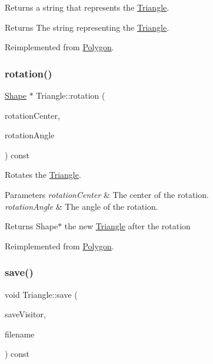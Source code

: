 Returns a string that represents the \hyperlink{class_triangle}{Triangle}. \begin{DoxyReturn}{Returns}
The string representing the \hyperlink{class_triangle}{Triangle}. 
\end{DoxyReturn}


Reimplemented from \hyperlink{class_polygon_a41c29b75f2463646af0f7bd604a4853d}{Polygon}.

\hypertarget{class_triangle_a663ca3c6bd7967265849bf1f8c8a464b}{}\label{class_triangle_a663ca3c6bd7967265849bf1f8c8a464b} 
\subsubsection{\texorpdfstring{rotation()}{rotation()}}
{\footnotesize\ttfamily \hyperlink{class_shape}{Shape} $\ast$ Triangle\+::rotation (\begin{DoxyParamCaption}\item[{const \hyperlink{class_vector2_d}{Vector2D} \&}]{rotation\+Center,  }\item[{const \hyperlink{class_radian_angle}{Radian\+Angle} \&}]{rotation\+Angle }\end{DoxyParamCaption}) const\hspace{0.3cm}{\ttfamily [virtual]}}

Rotates the \hyperlink{class_triangle}{Triangle}. 
\begin{DoxyParams}{Parameters}
{\em rotation\+Center} & The center of the rotation. \\
\hline
{\em rotation\+Angle} & The angle of the rotation. \\
\hline
\end{DoxyParams}
\begin{DoxyReturn}{Returns}
Shape$\ast$ the new \hyperlink{class_triangle}{Triangle} after the rotation 
\end{DoxyReturn}


Reimplemented from \hyperlink{class_polygon_a5a453f01700f97ca98b0487cd670b194}{Polygon}.

\hypertarget{class_triangle_ae9ac3d633172f14d391d290a4467e1d3}{}\label{class_triangle_ae9ac3d633172f14d391d290a4467e1d3} 
\subsubsection{\texorpdfstring{save()}{save()}}
{\footnotesize\ttfamily void Triangle\+::save (\begin{DoxyParamCaption}\item[{const \hyperlink{class_save_visitor}{Save\+Visitor} $\ast$}]{save\+Visitor,  }\item[{const string \&}]{filename }\end{DoxyParamCaption}) const\hspace{0.3cm}{\ttfamily [virtual]}}

